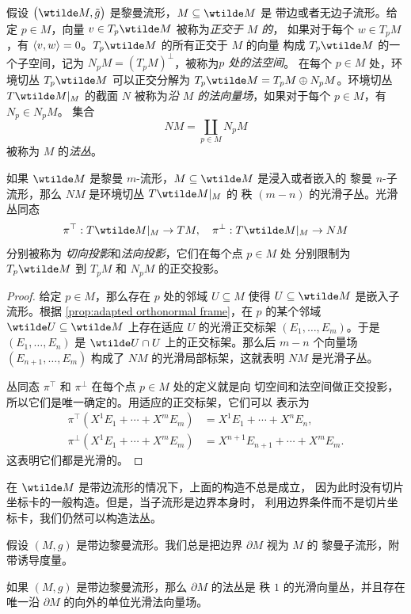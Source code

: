 假设 $\bigl(\wtilde M,\tilde g\bigr)$ 是黎曼流形，$M\subseteq \wtilde M$ 是
带边或者无边子流形。给定 $p\in M$，向量 $v\in T_p\wtilde M$ 被称为\emph{正交于 $M$ 的}，
如果对于每个 $w\in T_pM$，有 $\left\langle v,w\right\rangle=0$。$T_p\wtilde M$ 的所有正交于 $M$ 的向量
构成 $T_p\wtilde M$ 的一个子空间，记为 $N_pM=(T_pM)^\bot$，被称为\emph{$p$ 处的法空间}。
在每个 $p\in M$ 处，环境切丛 $T_p\wtilde M$ 可以正交分解为
$T_p\wtilde M=T_pM\oplus N_pM$。环境切丛 $T\wtilde M|_M$ 的截面
$N$ 被称为\emph{沿 $M$ 的法向量场}，如果对于每个 $p\in M$，有 $N_p\in N_pM$。
集合
\[
  NM=\coprod_{p\in M}N_pM
\]
被称为 $M$ 的\emph{法丛}。

\begin{proposition}[法丛]\label{prop:normal bundle}
  如果 $\wtilde M$ 是黎曼 $m$-流形，$M\subseteq \wtilde M$ 是浸入或者嵌入的
  黎曼 $n$-子流形，那么 $NM$ 是环境切丛 $T\wtilde M|_M$ 的
  秩 $(m-n)$ 的光滑子丛。光滑丛同态
  \[
    \pi^\top:T\wtilde M|_M\to TM,\quad \pi^\bot:T\wtilde M|_M\to NM
  \]
  分别被称为 \emph{切向投影}和\emph{法向投影}，它们在每个点 $p\in M$ 处
  分别限制为 $T_p\wtilde M$ 到 $T_pM$ 和 $N_pM$ 的正交投影。
\end{proposition}
\begin{proof}
  给定 $p\in M$，那么存在 $p$ 处的邻域 $U\subseteq M$ 使得 $U\subseteq \wtilde M$
  是嵌入子流形。根据 \autoref{prop:adapted orthonormal frame}，在 $p$
  的某个邻域 $\wtilde U\subseteq \wtilde M$ 上存在适应 $U$ 的光滑正交标架
  $(E_1,\dots,E_m)$。于是 $(E_1,\dots,E_n)$ 是 $\wtilde U\cap U$
  上的正交标架。那么后 $m-n$ 个向量场 $(E_{n+1},\dots,E_m)$ 
  构成了 $NM$ 的光滑局部标架，这就表明 $NM$ 是光滑子丛。

  丛同态 $\pi^\top$ 和 $\pi^\bot$ 在每个点 $p\in M$ 处的定义就是向
  切空间和法空间做正交投影，所以它们是唯一确定的。用适应的正交标架，它们可以
  表示为
  \begin{align*}
    \pi^\top(X^1E_1+\cdots+X^mE_m)&=X^1E_1+\cdots+X^nE_n,\\
    \pi^\bot(X^1E_1+\cdots+X^mE_m)&=X^{n+1}E_{n+1}+\cdots+X^mE_m.
  \end{align*}
  这表明它们都是光滑的。 
\end{proof}

在 $\wtilde M$ 是带边流形的情况下，上面的构造不总是成立，
因为此时没有切片坐标卡的一般构造。但是，当子流形是边界本身时，
利用边界条件而不是切片坐标卡，我们仍然可以构造法丛。

假设 $(M,g)$ 是带边黎曼流形。我们总是把边界 $\partial M$ 视为 $M$ 的
黎曼子流形，附带诱导度量。

\begin{proposition}[向外法向的存在性]
  如果 $(M,g)$ 是带边黎曼流形，那么 $\partial M$ 的法丛是
  秩 $1$ 的光滑向量丛，并且存在唯一沿 $\partial M$ 的向外的单位光滑法向量场。
\end{proposition}

